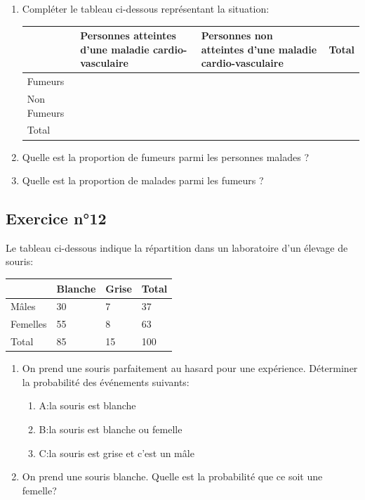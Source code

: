 \documentclass[12pt,a4paper]{article}
\begin{document}
\begin{enumerate}
    \item Compléter le tableau ci-dessous représentant la situation:
    \begin{center}
  

\begin{tabular}{|p{2.5cm}|p{4cm}|p{4cm}|p{2.5cm}|} \hline
 & Personnes atteintes d'une maladie cardio-vasculaire &Personnes non atteintes d'une maladie cardio-vasculaire& Total \\ \hline
Fumeurs &  & & \\ \hline
 Non Fumeurs & & & \\ \hline
Total & & & \\ \hline
\end{tabular} 
   
\end{center}
    
    
    \item Quelle est la proportion de fumeurs parmi les personnes malades ?
    \item Quelle est la proportion de malades parmi les fumeurs ?
\end{enumerate}

\subsection*{Exercice n°12}

Le tableau ci-dessous indique la répartition dans un laboratoire d’un élevage de souris:
\begin{center}
    

\begin{tabular}{|p{2.5cm}|p{4cm}|p{4cm}|p{2.5cm}|} \hline
&Blanche  &Grise & Total \\ \hline
Mâles &30  &7 & 37\\ \hline
 Femelles & 55 & 8 & 63 \\ \hline
Total &85 &15 &100 \\ \hline
\end{tabular} 
\end{center}



\begin{enumerate}
    \item On prend une souris parfaitement au hasard pour une expérience. Déterminer la probabilité des événements suivants:
    \begin{enumerate}
        
    \item A:\og la souris est blanche \fg
    \item B:\og la souris est blanche ou femelle \fg
    \item C:\og la souris est grise et c’est un mâle \fg
    \end{enumerate}
    \item On prend une souris blanche. Quelle est la probabilité que ce soit une femelle?
\end{enumerate}
\end{document}
